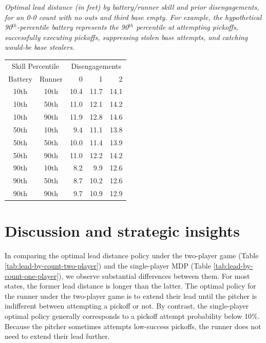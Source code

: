 \documentclass[opre,dblanonrev]{informs4}
\begin{document}
      \begin{table}
        \TABLE
         {\it Optimal lead distance (in feet) by battery/runner skill and prior disengagements, for an 0-0 count with no outs and third base empty. For example, the hypothetical 90$^{th}$-percentile battery represents the 90$^{th}$ percentile at attempting pickoffs, successfully executing pickoffs, suppressing stolen base attempts, and catching would-be base stealers. 
        \label{tab:lead-by-players}}
        {\begin{tabular}{cc|rrr}
    \multicolumn{2}{c|}{Skill Percentile} & \multicolumn{3}{c}{Disengagements}\\
    Battery & Runner & 0 & 1 & 2 \\
      \hline
    10th & 10th & 10.4 & 11.7 & 14.1 \\ 
      10th & 50th & 11.0 & 12.1 & 14.2 \\ 
      10th & 90th & 11.9 & 12.8 & 14.6 \\ 
       \hline
    50th & 10th & 9.4 & 11.1 & 13.8 \\ 
      50th & 50th & 10.0 & 11.4 & 13.9 \\ 
      50th & 90th & 11.0 & 12.2 & 14.2 \\ 
       \hline
    90th & 10th & 8.2 & 9.9 & 12.6 \\ 
      90th & 50th & 8.7 & 10.2 & 12.6 \\ 
      90th & 90th & 9.7 & 10.9 & 12.9 \\ 
    \end{tabular}}
        {}
      \end{table}

  \section{Discussion and strategic insights}
  \label{sec:discussion}

    In comparing the optimal lead distance policy under the two-player game (Table \ref{tab:lead-by-count-two-player}) and the single-player MDP (Table \ref{tab:lead-by-count-one-player}), we observe substantial differences between them. For most states, the former lead distance is longer than the latter. The optimal policy for the runner under the two-player game is to extend their lead until the pitcher is indifferent between attempting a pickoff or not. By contrast, the single-player optimal policy generally corresponds to a pickoff attempt probability below 10\%. Because the pitcher sometimes attempts low-success pickoffs, the runner does not need to extend their lead further.
\end{document}
